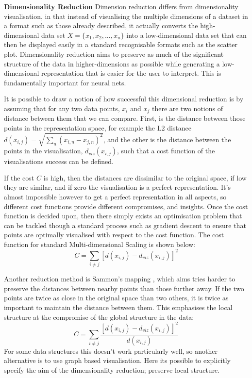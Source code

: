 \documentclass[a4paper,11pt,titlepage]{article}
\begin{document}
\textbf{Dimensionality Reduction}
		Dimension reduction differs from dimensionality visualisation, in that instead of visualising the multiple dimensions of a dataset in a format such as those already described, it actually converts the high-dimensional data set  $ X = \{ x_{1}, x_{2},..., x_{n} \} $ into a low-dimensional data set that can then be displayed easily in a standard recognisable formats such as the scatter plot. Dimensionality reduction aims to preserve as much of the significant structure of the data in higher-dimensions as possible while generating a low-dimensional representation that is easier for the user to interpret. This is fundamentally important for neural nets.
		\par 
		It is possible to draw a notion of how successful this dimensional reduction is by assuming that for any two data points, $ x_{i} $ and $ x_{j} $ there are two notions of distance between them that we can compare. First, is the distance between those points in the representation space, for example the L2 distance $ d(x_{i,j}) = \sqrt{\sum\nolimits_{n} (x_{i,n} - x_{j,n})^2 } $, and the other is the  distance between the points in the visualisation, $ d_{viz}(x_{i,j}) $, such that a cost function of the visualisations success can be defined.
		\par  		
		If the cost $ C $ is high, then the distances are dissimilar to the original space, if low they are similar, and if zero the visualisation is a perfect representation. It's almost impossible however to get a perfect representation in all aspects, so different cost functions provide different compromises, and insights. Once the cost function is decided upon, then there simply exists an optimisation problem that can be tackled though a standard process such as gradient descent to ensure that  points are optimally visualised with respect to the cost function. The cost function for standard Multi-dimensional Scaling \cite{Torgerson1952} is shown below: 
		$$
			C = 
			\sum\limits_{i \neq j}
			[d(x_{i,j}) - d_{viz}(x_{i,j}) ]^2
		$$
		\par 
		Another reduction method is Sammon's mapping \cite{Sammon1969}, which aims tries harder to preserve the distances between nearby points than those further away. If the two points are twice as close in the original space than  two others, it is twice as important to maintain the distance between them. This emphasises the local structure at the compromise of the global structure in the data:
		$$
			C = 
			\sum\limits_{i \neq j}
			\frac{ [d(x_{i,j}) - d_{viz}(x_{i,j}) ]^2 }					{d(x_{i,j})}
		$$
		For some data structures this doesn't work particularly well, so another alternative is to use graph based visualisation. Here its possible to explicitly specify the aim of the dimensionality reduction; preserve local structure. 
\end{document}
